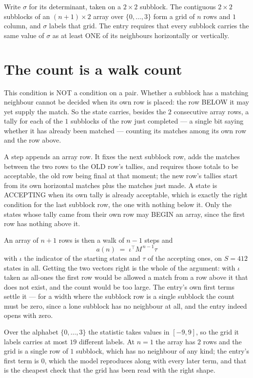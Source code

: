 \documentclass[11pt,a4paper]{article}
\theoremstyle{plain}
\theoremstyle{definition}
\begin{document}
Write $\sigma$ for its determinant, taken on a $2\times2$ subblock. The contiguous $2\times2$
subblocks of an $(n+1)\times2$ array over $\{0,\dots,3\}$ form a grid of $n$ rows
and $1$ column, and $\sigma$ labels that grid. The entry
requires that every subblock carries the same value of $\sigma$ as at least ONE of its neighbours horizontally or vertically.

\section{The count is a walk count}

This condition is NOT a condition on a pair. Whether a subblock has a
matching neighbour cannot be decided when its own row is placed: the row BELOW it may yet
supply the match. So the state carries, besides the $2$ consecutive array rows, a tally for
each of the $1$ subblocks of the row just completed --- a single bit saying whether it has already been matched --- counting its matches
among its own row and the row above.

A step appends an array row. It fixes the next subblock row, adds the matches between the two
rows to the OLD row's tallies, and requires those totals to be acceptable, the old row being
final at that moment; the new row's tallies start from its own horizontal matches plus the
matches just made. A state is ACCEPTING when its own tally is already acceptable, which is
exactly the right condition for the last subblock row, the one with nothing below it. Only the
states whose tally came from their own row may BEGIN an array, since the first row has nothing
above it.

An array of $n+1$ rows is then a walk of $n-1$ steps and
\[
a(n)\;=\;\iota^{\!\top}M^{\,n-1}\tau
\]
with $\iota$ the indicator of the starting states and $\tau$ of the accepting ones, on
$S=412$ states in all. Getting the two vectors right is the whole of the argument: with
$\iota$ taken as all-ones the first row would be allowed a match from a row above it that does
not exist, and the count would be too large. The entry's own first terms settle it --- for
a width where the subblock row is a single subblock
the count must be zero, since a lone subblock has no neighbour at all, and the entry indeed opens with zero.

Over the alphabet $\{0,\dots,3\}$ the statistic takes values in $[-9,9]$, so the
grid it labels carries at most $19$ different labels. At $n=1$ the array has $2$
rows and the grid is a single row of $1$
subblock, which has no neighbour of any kind; the entry's first term is
$0$, which the model reproduces along with every later term, and that is the cheapest
check that the grid has been read with the right shape.
\end{document}
